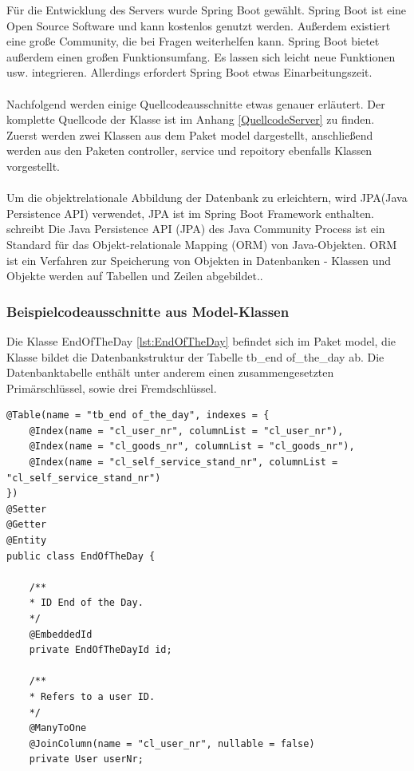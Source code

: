 Für die Entwicklung des Servers wurde Spring Boot gewählt. Spring Boot ist eine Open Source Software und kann kostenlos genutzt werden. Außerdem existiert eine große Community, die bei Fragen weiterhelfen kann. Spring Boot bietet außerdem einen großen Funktionsumfang. Es lassen sich leicht neue Funktionen usw. integrieren. Allerdings erfordert Spring Boot etwas Einarbeitungszeit.
 \\
 \\
Nachfolgend werden einige Quellcodeausschnitte etwas genauer erläutert. Der komplette Quellcode der Klasse ist im Anhang \ref{QuellcodeServer} zu finden.
Zuerst werden zwei Klassen aus dem Paket model dargestellt, anschließend werden aus den Paketen controller, service und repoitory ebenfalls Klassen vorgestellt. 
\\
\\
Um die objektrelationale Abbildung der Datenbank zu erleichtern, wird JPA(Java Persistence API) verwendet, JPA ist im Spring Boot Framework enthalten. \cite{JPA} schreibt \grqq Die Java Persistence API (JPA) des Java Community Process ist ein Standard für das Objekt-relationale Mapping (ORM) von Java-Objekten. ORM ist ein Verfahren zur Speicherung von Objekten in Datenbanken - Klassen und Objekte werden auf Tabellen und Zeilen abgebildet.\grqq{}. 

\subsubsection{Beispielcodeausschnitte aus Model-Klassen}

Die Klasse EndOfTheDay \ref{lst:EndOfTheDay} befindet sich im Paket model, die Klasse bildet die Datenbankstruktur der Tabelle tb\_end of\_the\_day ab. Die Datenbanktabelle enthält unter anderem einen zusammengesetzten Primärschlüssel, sowie drei Fremdschlüssel. 
\\
\lstset{language=java}
\begin{lstlisting}[frame=tb, caption={Das Listing zeigt einen Ausschnitt aus der Klasse EndOfTheDay}, label={lst:EndOfTheDayAus}]
@Table(name = "tb_end of_the_day", indexes = {
	@Index(name = "cl_user_nr", columnList = "cl_user_nr"),
	@Index(name = "cl_goods_nr", columnList = "cl_goods_nr"),
	@Index(name = "cl_self_service_stand_nr", columnList = "cl_self_service_stand_nr")
})
@Setter
@Getter
@Entity
public class EndOfTheDay {
	
	/**
	* ID End of the Day.
	*/
	@EmbeddedId
	private EndOfTheDayId id;
	
	/**
	* Refers to a user ID.
	*/
	@ManyToOne
	@JoinColumn(name = "cl_user_nr", nullable = false)
	private User userNr;
\end{lstlisting}


